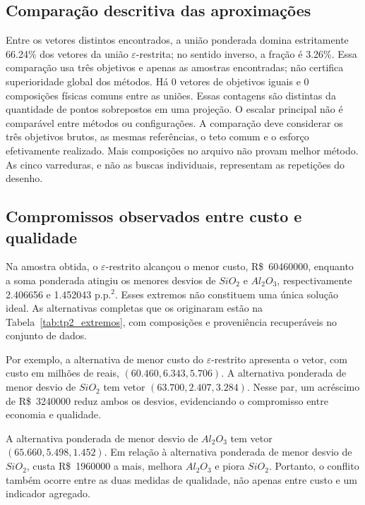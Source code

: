 \documentclass[12pt,a4paper]{article}
\begin{document}
\subsection{Comparação descritiva das aproximações}
Entre os vetores distintos encontrados, a união ponderada domina estritamente \num{66.24}\% dos vetores da união $\varepsilon$-restrita; no sentido inverso, a fração é \num{3.26}\%. Essa comparação usa três objetivos e apenas as amostras encontradas; não certifica superioridade global dos métodos.
Há 0 vetores de objetivos iguais e 0 composições físicas comuns entre as uniões. Essas contagens são distintas da quantidade de pontos sobrepostos em uma projeção.
O escalar principal não é comparável entre métodos ou configurações. A comparação deve considerar os três objetivos brutos, as mesmas referências, o teto comum e o esforço efetivamente realizado. Mais composições no arquivo não provam melhor método. As cinco varreduras, e não as buscas individuais, representam as repetições do desenho.




\subsection{Compromissos observados entre custo e qualidade}

Na amostra obtida, o $\varepsilon$-restrito alcançou o menor custo,
R\$~\num{60460000}, enquanto a soma ponderada atingiu os menores desvios
de $SiO_2$ e $Al_2O_3$, respectivamente \num{2.406656} e \num{1.452043}
p.p.$^2$. Esses extremos não constituem uma única solução ideal. As
alternativas completas que os originaram estão na
Tabela~\ref{tab:tp2_extremos}, com composições e proveniência recuperáveis
no conjunto de dados.

Por exemplo, a alternativa de menor custo do $\varepsilon$-restrito
apresenta o vetor, com custo em milhões de reais,
$(\num{60.460},\num{6.343},\num{5.706})$. A alternativa ponderada de menor
desvio de $SiO_2$ tem vetor
$(\num{63.700},\num{2.407},\num{3.284})$.
Nesse par, um acréscimo de R\$~\num{3240000} reduz ambos os desvios,
evidenciando o compromisso entre economia e qualidade.

A alternativa ponderada de menor desvio de $Al_2O_3$ tem vetor
$(\num{65.660},\num{5.498},\num{1.452})$.
Em relação à alternativa ponderada de menor desvio de $SiO_2$, custa
R\$~\num{1960000} a mais, melhora $Al_2O_3$ e piora $SiO_2$.
Portanto, o conflito também ocorre entre as duas medidas de qualidade,
não apenas entre custo e um indicador agregado.
\end{document}
